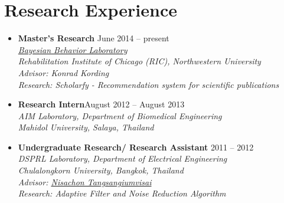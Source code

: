 \section{\sc Research Experience}

\begin{itemize}[leftmargin=0cm, label={}]

\item {\bf Master's Research} \hfill{June 2014 -- present}\\
{\em \href{http://klab.smpp.northwestern.edu/wiki/index.php5/Main_Page}{Bayesian Behavior Laboratory}\\
Rehabilitation Institute of Chicago (RIC), Northwestern University \\
Advisor: Konrad Kording \\
Research: Scholarfy - Recommendation system for scientific publications}

\item {\bf Research Intern}\hfill{August 2012 -- August 2013}\\
{\em AIM Laboratory, Department of Biomedical Engineering\\
Mahidol University, Salaya, Thailand}

\item {\bf Undergraduate Research/ Research Assistant}		\hfill{2011 -- 2012}\\
{\em DSPRL Laboratory, Department of Electrical Engineering\\
Chulalongkorn University, Bangkok, Thailand\\
Advisor: \href{http://nisachon.lecturer.eng.chula.ac.th}{Nisachon Tangsangiumvisai}\\
Research: Adaptive Filter and Noise Reduction Algorithm}

\end{itemize}
